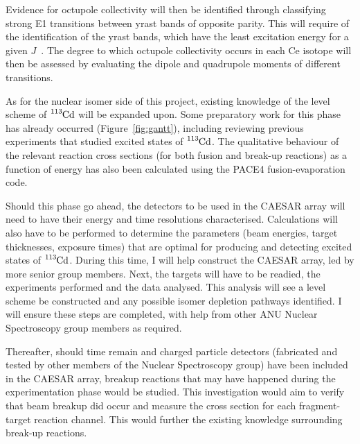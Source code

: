 \documentclass[12pt,a4paper]{article}
\begin{document}
\medskip
\noindent
Evidence for octupole collectivity will then be identified through classifying strong E1 transitions between yrast bands of opposite parity.
This will require of the identification of the yrast bands, which have the least excitation energy for a given $J$~\cite{casten_nuclear_1990}.
The degree to which octupole collectivity occurs in each Ce isotope will then be assessed by evaluating the dipole and quadrupole moments of different transitions.


\medskip
\noindent
As for the nuclear isomer side of this project, existing knowledge of the level scheme of $\ce{^{113}Cd}$ will be expanded upon.
Some preparatory work for this phase has already occurred (Figure~\ref{fig:gantt}), including reviewing previous experiments that studied excited states of $\ce{^{113}Cd}$.
The qualitative behaviour of the relevant reaction cross sections (for both fusion and break-up reactions) as a function of energy has also been calculated using the PACE4 fusion-evaporation code.

\medskip
\noindent
Should this phase go ahead, the detectors to be used in the CAESAR array will need to have their energy and time resolutions characterised.
Calculations will also have to be performed to determine the parameters (beam energies, target thicknesses, exposure times) that are optimal for producing and detecting excited states of $\ce{^{113}Cd}$.
During this time, I will help construct the CAESAR array, led by more senior group members.
Next, the targets will have to be readied, the experiments performed and the data analysed. 
This analysis will see a level scheme be constructed and any possible isomer depletion pathways identified.
I will ensure these steps are completed, with help from other ANU Nuclear Spectroscopy group members as required.

\medskip
\noindent
Thereafter, should time remain and charged particle detectors (fabricated and tested by other members of the Nuclear Spectroscopy group) have been included in the CAESAR array, breakup reactions that may have happened during the experimentation phase would be studied.
This investigation would aim to verify that beam breakup did occur and measure the cross section for each fragment-target reaction channel.
This would further the existing knowledge surrounding break-up reactions.
\end{document}
